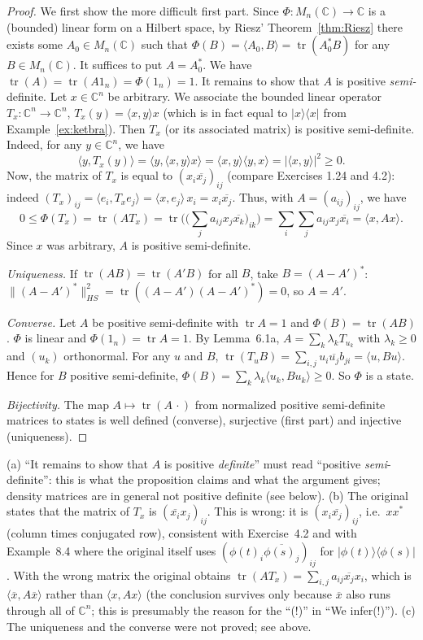 \documentclass[11pt,a4paper]{article}
\numberwithin{equation}{section}
\newcommand{\C}{\mathbb{C}}
\newcommand{\ip}[2]{\langle #1, #2\rangle}
\newcommand{\ketbra}[2]{|#1\rangle\langle #2|}
\newcommand{\conj}[1]{\overline{#1}}
\DeclareMathOperator{\tr}{tr}
\theoremstyle{plain}
\theoremstyle{definition}
\theoremstyle{plain}
\theoremstyle{definition}
\begin{document}
\begin{proof}
We first show the more difficult first part. Since $\Phi:M_n(\C)\to\C$ is a (bounded)
linear form on a Hilbert space, by Riesz' Theorem~\ref{thm:Riesz} there exists some
$A_0\in M_n(\C)$ such that $\Phi(B)=\ip{A_0}{B}=\tr(A_0^*B)$ for any $B\in M_n(\C)$. It
suffices to put $A=A_0^*$. We have $\tr(A)=\tr(A1_n)=\Phi(1_n)=1$. It remains to show that
$A$ is positive \emph{semi-}definite. Let $x\in\C^n$ be arbitrary. We associate the bounded
linear operator $T_x:\C^n\to\C^n$, $T_x(y)=\ip{x}{y}x$ (which is in fact equal to
$\ketbra{x}{x}$ from Example~\ref{ex:ketbra}). Then $T_x$ (or its associated matrix) is
positive semi-definite. Indeed, for any $y\in\C^n$, we have
\[
\ip{y}{T_x(y)}=\ip{y}{\ip{x}{y}x}=\ip{x}{y}\ip{y}{x}=|\ip{x}{y}|^2\ge0 .
\]
Now, the matrix of $T_x$ is equal to $(x_i\conj{x_j})_{ij}$ (compare Exercises 1.24 and 4.2):
indeed $(T_x)_{ij}=\ip{e_i}{T_xe_j}=\ip{x}{e_j}\,x_i=x_i\conj{x_j}$. Thus, with $A=(a_{ij})_{ij}$,
we have
\[
0\le\Phi(T_x)=\tr(AT_x)=\tr\Big(\Big(\sum_ja_{ij}x_j\conj{x_k}\Big)_{ik}\Big)
=\sum_i\sum_ja_{ij}x_j\conj{x_i}=\ip{x}{Ax}.
\]
Since $x$ was arbitrary, $A$ is positive semi-definite.

\emph{Uniqueness.} If $\tr(AB)=\tr(A'B)$ for all $B$, take $B=(A-A')^*$:
$\|(A-A')^*\|_{HS}^2=\tr((A-A')(A-A')^*)=0$, so $A=A'$.

\emph{Converse.} Let $A$ be positive semi-definite with $\tr A=1$ and $\Phi(B)=\tr(AB)$.
$\Phi$ is linear and $\Phi(1_n)=\tr A=1$. By Lemma~6.1a, $A=\sum_k\lambda_k T_{u_k}$ with
$\lambda_k\ge0$ and $(u_k)$ orthonormal. For any $u$ and $B$,
$\tr(T_uB)=\sum_{i,j}u_i\conj{u_j}b_{ji}=\ip{u}{Bu}$. Hence for $B$ positive semi-definite,
$\Phi(B)=\sum_k\lambda_k\ip{u_k}{Bu_k}\ge0$. So $\Phi$ is a state.

\emph{Bijectivity.} The map $A\mapsto\tr(A\,\cdot)$ from normalized positive semi-definite
matrices to states is well defined (converse), surjective (first part) and injective
(uniqueness).
\end{proof}

\begin{correction}
(a) ``It remains to show that $A$ is positive \emph{definite}'' must read
``positive \emph{semi}-definite'': this is what the proposition claims and what the
argument gives; density matrices are in general not positive definite (see below).
(b) The original states that the matrix of $T_x$ is $(\conj{x_i}x_j)_{ij}$. This is wrong:
it is $(x_i\conj{x_j})_{ij}$, i.e.\ $xx^*$ (column times conjugated row), consistent with
Exercise~4.2 and with Example~8.4 where the original itself uses
$(\phi(t)_i\conj{\phi(s)_j})_{ij}$ for $\ketbra{\phi(t)}{\phi(s)}$. With the wrong matrix the
original obtains $\tr(AT_x)=\sum_{i,j}a_{ij}\conj{x_j}x_i$, which is $\ip{\conj x}{A\conj x}$
rather than $\ip{x}{Ax}$ (the conclusion survives only because $\conj x$ also runs through
all of $\C^n$; this is presumably the reason for the ``(!)'' in ``We infer(!)'').
(c) The uniqueness and the converse were not proved; see above.
\end{correction}
\end{document}
